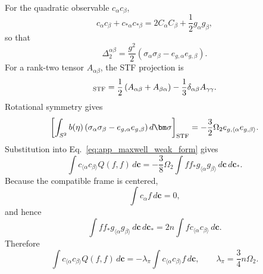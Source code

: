 \documentclass[11pt,oneside]{article}
\numberwithin{equation}{section}
\theoremstyle{definition}
\begin{document}
For the quadratic observable $c_\alpha c_\beta$,
\begin{equation}
c_\alpha c_\beta+c_{*\alpha}c_{*\beta}
=
2C_\alpha C_\beta+\frac12g_\alpha g_\beta,
\end{equation}
so that
\begin{equation}
\Delta_2^{\alpha\beta}
=
\frac{g^2}{2}
\left(
\sigma_\alpha\sigma_\beta
-e_{g,\alpha}e_{g,\beta}
\right).
\end{equation}
For a rank-two tensor $A_{\alpha\beta}$, the STF projection is
\begin{equation}
[A_{\alpha\beta}]_{\rm STF}
=
\frac12\left(A_{\alpha\beta}+A_{\beta\alpha}\right)
-\frac13\delta_{\alpha\beta}A_{\gamma\gamma}.
\end{equation}
Rotational symmetry gives
\begin{equation}
\left[
\int_{S^2}b(\eta)
\left(
\sigma_\alpha\sigma_\beta
-e_{g,\alpha}e_{g,\beta}
\right)d\bm\sigma
\right]_{\rm STF}
=
-\frac32\Omega_2
e_{g,\langle\alpha}e_{g,\beta\rangle}.
\end{equation}
Substitution into Eq.~\eqref{eq:app_maxwell_weak_form} gives
\begin{equation}
\int c_{\langle\alpha}c_{\beta\rangle}Q(f,f)\,d\bm c
=
-\frac38\Omega_2
\int ff_*g_{\langle\alpha}g_{\beta\rangle}
\,d\bm c\,d\bm c_*.
\end{equation}
Because the compatible frame is centered,
\begin{equation}
\int c_\alpha f\,d\bm c=0,
\end{equation}
and hence
\begin{equation}
\int ff_*g_{\langle\alpha}g_{\beta\rangle}
\,d\bm c\,d\bm c_*
=
2n\int f c_{\langle\alpha}c_{\beta\rangle}\,d\bm c.
\end{equation}
Therefore
\begin{equation}
\int c_{\langle\alpha}c_{\beta\rangle}Q(f,f)\,d\bm c
=
-\lambda_\pi
\int c_{\langle\alpha}c_{\beta\rangle}f\,d\bm c,
\qquad
\lambda_\pi=\frac34n\Omega_2.
\label{eq:app_maxwell_lambda_pi}
\end{equation}
\end{document}
